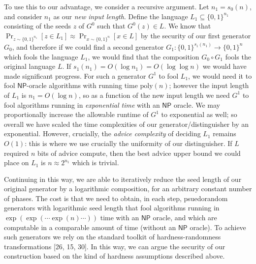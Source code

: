 \documentclass[10pt,a4paper]{article}
\begin{document}
To use this to our advantage, we consider a recursive argument. Let $n_{1}=s_{0}(n)$, and consider $n_{1}$ as our \emph{new input length}. Define the language $L_{1}\subseteq\{0,1\}^{n_{1}}$ consisting of the seeds $z$ of $G^{0}$ such that $G^{0}(z)\in L$. We know that $\Pr_{z\sim\{0,1\}^{n_{1}}}[z\in L_{1}]\approx\Pr_{x\sim\{0,1\}^{n}}[x\in L]$ by the security of our first generator $G_{0}$, and therefore if we could find a second generator $G_{1}:\{0,1\}^{s_{1}(n_{1})}\to\{0,1\}^{n}$ which fools the language $L_{1}$, we would find that the composition $G_{0}\circ G_{1}$ fools the original language $L$. If $s_{1}(n_{1})=O(\log n_{1})=O(\log\log n)$ we would have made significant progress. For such a generator $G^{1}$ to fool $L_{1}$, we would need it to fool ${\mathsf{NP}}$-oracle algorithms with running time $\mathrm{poly}(n)$; however the input length of $L_{1}$ is $n_{1}=O(\log n)$, so as a function of the new input length we need $G^{1}$ to fool algorithms running in \emph{exponential time} with an ${\mathsf{NP}}$ oracle. We may proportionally increase the allowable runtime of $G^{1}$ to exponential as well; so overall we have scaled the time complexities of our generator/distinguisher by an exponential. However, crucially, the \emph{advice complexity} of deciding $L_{1}$ remains $O(1)$: this is where we use crucially the uniformity of our distinguisher. If $L$ required $n$ bits of advice compute, then the best advice upper bound we could place on $L_{1}$ is $n\approx 2^{n_{1}}$ which is trivial.\par




Continuing in this way, we are able to iteratively reduce the seed length of our original generator by a logarithmic composition, for an arbitrary constant number of phases. The cost is that we need to obtain, in each step, psuedorandom generators with logarithmic seed length that fool algorithms running in $\exp(\exp(\cdots\exp(n)\cdots))$ time with an ${\mathsf{NP}}$ oracle, and which are computable in a comparable amount of time (without an ${\mathsf{NP}}$ oracle). To achieve such generators we rely on the standard toolkit of hardness-randomness transformations [26, 15, 30]. In this way, we can argue the security of our construction based on the kind of hardness assumptions described above.\par
\end{document}
